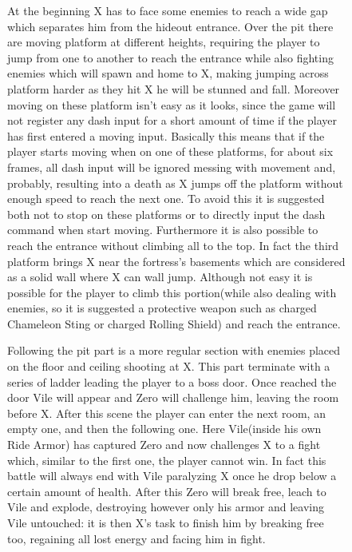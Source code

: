 \begin{figure}[htp]
At the beginning X has to face some enemies to reach a wide gap which separates him from the hideout entrance. Over the pit there are moving platform at different heights, requiring the player to jump from one to another to reach the entrance while also fighting enemies which will spawn and home to X, making jumping across platform harder as they hit X he will be stunned and fall. Moreover moving on these platform isn't easy as it looks, since the game will not register any dash input for a short amount of time if the player has first entered a moving input\cite{RTA_wiki:X1}. Basically this means that if the player starts moving when on one of these platforms, for about six frames, all dash input will be ignored messing with movement and, probably, resulting into a death as X jumps off the platform without enough speed to reach the next one. To avoid this it is suggested both not to stop on these platforms or to directly input the dash command when start moving. Furthermore it is also possible to reach the entrance without climbing all to the top. In fact the third platform brings X near the fortress's basements which are considered as a solid wall where X can wall jump. Although not easy it is possible for the player to climb this portion(while also dealing with enemies, so it is suggested a protective weapon such as charged Chameleon Sting or charged Rolling Shield) and reach the entrance.

Following the pit part is a more regular section with enemies placed on the floor and ceiling shooting at X. This part terminate with a series of ladder leading the player to a boss door. Once reached the door Vile will appear and Zero will challenge him, leaving the room before X. After this scene the player can enter the next room, an empty one, and then the following one. Here Vile(inside his own Ride Armor) has captured Zero and now challenges X to a fight which, similar to the first one, the player cannot win. In fact this battle will always end with Vile paralyzing X once he drop below a certain amount of health. After this Zero will break free, leach to Vile and explode, destroying however only his armor and leaving Vile untouched: it is then X's task to finish him by breaking free too, regaining all lost energy and facing him in fight.


\end{figure}
